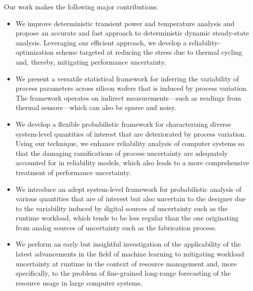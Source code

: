 Our work makes the following major contributions.

\begin{itemize}

\item
We improve deterministic transient power and temperature analysis and propose an
accurate and fast approach to deterministic dynamic steady-state analysis.
Leveraging our efficient approach, we develop a reliability-optimization scheme
targeted at reducing the stress due to thermal cycling \cite{jedec2016} and,
thereby, mitigating performance uncertainty.

\item
We present a versatile statistical framework for inferring the variability of
process parameters across silicon wafers that is induced by process variation.
The framework operates on indirect measurements---such as readings from thermal
sensors---which can also be sparse and noisy.

\item
We develop a flexible probabilistic framework for characterizing diverse
system-level quantities of interest that are deteriorated by process variation.
Using our technique, we enhance reliability analysis of computer systems so that
the damaging ramifications of process uncertainty are adequately accounted for
in reliability models, which also leads to a more comprehensive treatment of
performance uncertainty.

\item
We introduce an adept system-level framework for probabilistic analysis of
various quantities that are of interest but also uncertain to the designer due
to the variability induced by digital sources of uncertainty such as the runtime
workload, which tends to be less regular than the one originating from analog
sources of uncertainty such as the fabrication process.

\item
We perform an early but insightful investigation of the applicability of the
latest advancements in the field of machine learning to mitigating workload
uncertainty at runtime in the context of resource management and, more
specifically, to the problem of fine-grained long-range forecasting of the
resource usage in large computer systems.

\end{itemize}
